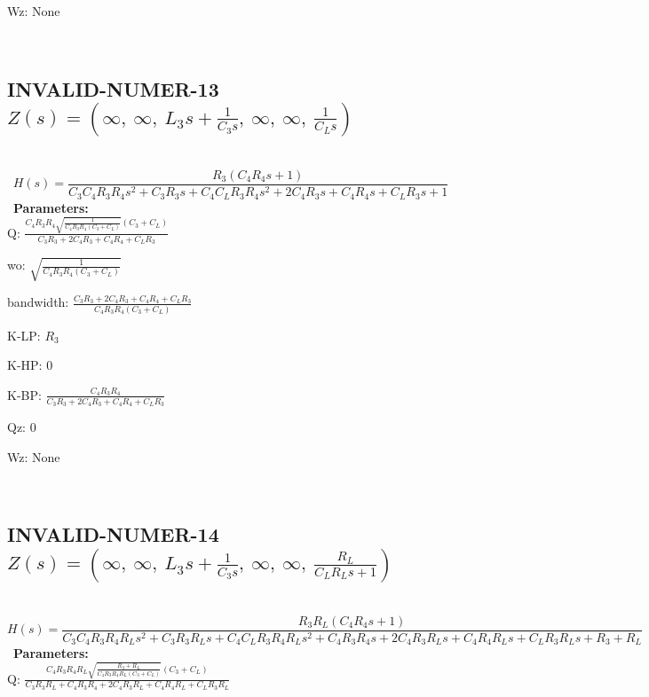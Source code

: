 \documentclass{article}
\begin{document}
Wz: $\text{None}$\ 

\ 

\subsection{INVALID-NUMER-13 $Z(s) = \left( \infty, \  \infty, \  L_{3} s + \frac{1}{C_{3} s}, \  \infty, \  \infty, \  \frac{1}{C_{L} s}\right)$ } \ 
\textbf{\[H(s) = \frac{R_{3} \left(C_{4} R_{4} s + 1\right)}{C_{3} C_{4} R_{3} R_{4} s^{2} + C_{3} R_{3} s + C_{4} C_{L} R_{3} R_{4} s^{2} + 2 C_{4} R_{3} s + C_{4} R_{4} s + C_{L} R_{3} s + 1}\] } \ 
\textbf{Parameters:}\\ 

Q: $\frac{C_{4} R_{3} R_{4} \sqrt{\frac{1}{C_{4} R_{3} R_{4} \left(C_{3} + C_{L}\right)}} \left(C_{3} + C_{L}\right)}{C_{3} R_{3} + 2 C_{4} R_{3} + C_{4} R_{4} + C_{L} R_{3}}$\ 

wo: $\sqrt{\frac{1}{C_{4} R_{3} R_{4} \left(C_{3} + C_{L}\right)}}$\ 

bandwidth: $\frac{C_{3} R_{3} + 2 C_{4} R_{3} + C_{4} R_{4} + C_{L} R_{3}}{C_{4} R_{3} R_{4} \left(C_{3} + C_{L}\right)}$\ 

K-LP: $R_{3}$\ 

K-HP: $0$\ 

K-BP: $\frac{C_{4} R_{3} R_{4}}{C_{3} R_{3} + 2 C_{4} R_{3} + C_{4} R_{4} + C_{L} R_{3}}$\ 

Qz: $0$\ 

Wz: $\text{None}$\ 

\ 

\subsection{INVALID-NUMER-14 $Z(s) = \left( \infty, \  \infty, \  L_{3} s + \frac{1}{C_{3} s}, \  \infty, \  \infty, \  \frac{R_{L}}{C_{L} R_{L} s + 1}\right)$ } \ 
\textbf{\[H(s) = \frac{R_{3} R_{L} \left(C_{4} R_{4} s + 1\right)}{C_{3} C_{4} R_{3} R_{4} R_{L} s^{2} + C_{3} R_{3} R_{L} s + C_{4} C_{L} R_{3} R_{4} R_{L} s^{2} + C_{4} R_{3} R_{4} s + 2 C_{4} R_{3} R_{L} s + C_{4} R_{4} R_{L} s + C_{L} R_{3} R_{L} s + R_{3} + R_{L}}\] } \ 
\textbf{Parameters:}\\ 

Q: $\frac{C_{4} R_{3} R_{4} R_{L} \sqrt{\frac{R_{3} + R_{L}}{C_{4} R_{3} R_{4} R_{L} \left(C_{3} + C_{L}\right)}} \left(C_{3} + C_{L}\right)}{C_{3} R_{3} R_{L} + C_{4} R_{3} R_{4} + 2 C_{4} R_{3} R_{L} + C_{4} R_{4} R_{L} + C_{L} R_{3} R_{L}}$\ 
\end{document}
